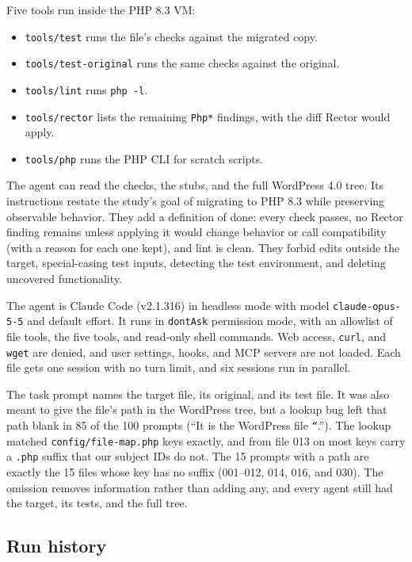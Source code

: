 \documentclass[11pt]{article}
\newcommand{\code}[1]{\texttt{#1}}
\begin{document}
Five tools run inside the PHP 8.3 VM:
\begin{itemize}
  \item \code{tools/test} runs the file's checks against the migrated copy.
  \item \code{tools/test-original} runs the same checks against the original.
  \item \code{tools/lint} runs \code{php -l}.
  \item \code{tools/rector} lists the remaining \code{Php*} findings, with the diff Rector would apply.
  \item \code{tools/php} runs the PHP CLI for scratch scripts.
\end{itemize}

The agent can read the checks, the stubs, and the full WordPress 4.0 tree.
Its instructions restate the study's goal of migrating to PHP 8.3 while preserving observable behavior.
They add a definition of done: every check passes, no Rector finding remains unless applying it would change behavior or call compatibility (with a reason for each one kept), and lint is clean.
They forbid edits outside the target, special-casing test inputs, detecting the test environment, and deleting uncovered functionality.

The agent is Claude Code (v2.1.316) in headless mode with model \code{claude-opus-5-5} and default effort.
It runs in \code{dontAsk} permission mode, with an allowlist of file tools, the five tools, and read-only shell commands.
Web access, \code{curl}, and \code{wget} are denied, and user settings, hooks, and MCP servers are not loaded.
Each file gets one session with no turn limit, and six sessions run in parallel.

The task prompt names the target file, its original, and its test file.
It was also meant to give the file's path in the WordPress tree, but a lookup bug left that path blank in 85 of the 100 prompts (``It is the WordPress file \code{``}.'').
The lookup matched \code{config/file-map.php} keys exactly, and from file 013 on most keys carry a \code{.php} suffix that our subject IDs do not.
The 15 prompts with a path are exactly the 15 files whose key has no suffix (001--012, 014, 016, and 030).
The omission removes information rather than adding any, and every agent still had the target, its tests, and the full tree.

\subsection{Run history}
\label{sec:runs}
\end{document}
